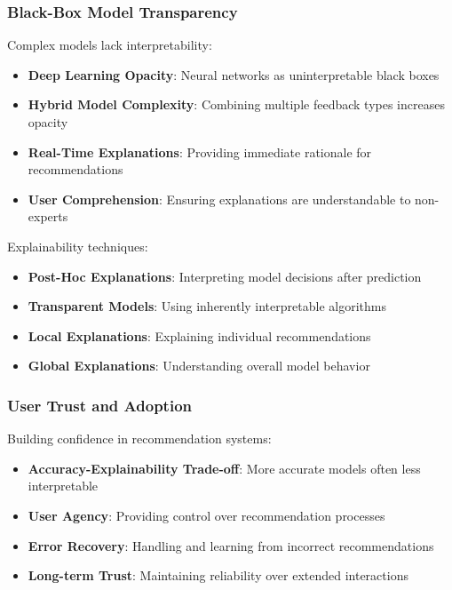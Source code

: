 \documentclass[acmsmall,review,anonymous]{acmart}
\begin{document}
\subsubsection{Black-Box Model Transparency}

Complex models lack interpretability:

\begin{itemize}
    \item \textbf{Deep Learning Opacity}: Neural networks as uninterpretable black boxes
    \item \textbf{Hybrid Model Complexity}: Combining multiple feedback types increases opacity
    \item \textbf{Real-Time Explanations}: Providing immediate rationale for recommendations
    \item \textbf{User Comprehension}: Ensuring explanations are understandable to non-experts
\end{itemize}

Explainability techniques:
\begin{itemize}
    \item \textbf{Post-Hoc Explanations}: Interpreting model decisions after prediction
    \item \textbf{Transparent Models}: Using inherently interpretable algorithms
    \item \textbf{Local Explanations}: Explaining individual recommendations
    \item \textbf{Global Explanations}: Understanding overall model behavior
\end{itemize}

\subsubsection{User Trust and Adoption}

Building confidence in recommendation systems:

\begin{itemize}
    \item \textbf{Accuracy-Explainability Trade-off}: More accurate models often less interpretable
    \item \textbf{User Agency}: Providing control over recommendation processes
    \item \textbf{Error Recovery}: Handling and learning from incorrect recommendations
    \item \textbf{Long-term Trust}: Maintaining reliability over extended interactions
\end{itemize}
\end{document}
